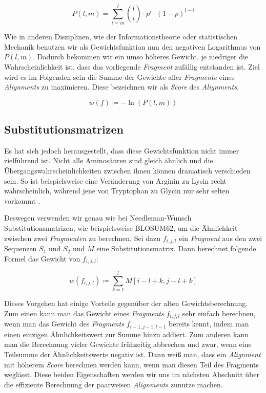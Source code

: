 \begin{equation}
	P(l,m) = \sum_{i=m}^{l} {l \choose i} \cdot p^i \cdot (1-p)^{l-i}
\end{equation}

Wie in anderen Disziplinen, wie der Informationstheorie oder statistischen Mechanik benutzen wir als Gewichtsfunktion nun den negativen Logarithmus von $P(l,m)$. Dadurch bekommen wir ein umso höheres Gewicht, je niedriger die Wahrscheinlichkeit ist, dass das vorliegende \emph{Fragment} zufällig entstanden ist. Ziel wird es im Folgenden sein die Summe der Gewichte aller \emph{Fragmente} eines \emph{Alignments} zu maximieren. Diese bezeichnen wir als \emph{Score} des \emph{Alignments}.

\begin{equation}
	w(f) \coloneqq -\ln(P(l,m))	
\end{equation}

\subsection{Substitutionsmatrizen}

Es hat sich jedoch herausgestellt, dass diese Gewichtsfunktion nicht immer zielführend ist. Nicht alle Aminosäuren sind gleich ähnlich und die Übergangswahrscheinlichkeiten zwischen ihnen können dramatisch verschieden sein. So ist beispielsweise eine Veränderung von Arginin zu Lysin recht wahrscheinlich, während jene von Tryptophan zu Glycin nur sehr selten vorkommt \citep{p13}. 

Deswegen verwenden wir genau wie bei Needleman-Wunsch Substitutionsmatrizen, wie beispielsweise BLOSUM62, um die Ähnlichkeit zwischen zwei \emph{Fragmenten} zu berechnen. Sei dazu $f_{i,j,l}$ ein \emph{Fragment} aus den zwei Sequenzen $S_1$ und $S_2$ und $M$ eine Substitutionsmatrix. Dann berechnet folgende Formel das Gewicht von $f_{i,j,l}$:

\begin{equation}
	w(f_{i,j,l}) \coloneqq \sum_{k=1}^{l} M[i\!-\!l\!+\!k,j\!-\!l\!+\!k]
\end{equation}

Dieses Vorgehen hat einige Vorteile gegenüber der alten Gewichtsberechnung. Zum einen kann man das Gewicht eines \emph{Fragments} $f_{i,j,l}$ sehr einfach berechnen, wenn man das Gewicht des \emph{Fragments} $f_{i-1,j-1,l-1}$ bereits kennt, indem man einen einzigen Ähnlichkeitswert zur Summe hinzu addiert. Zum anderen kann man die Berechnung vieler Gewichte frühzeitig abbrechen und zwar, wenn eine Teilsumme der Ähnlichkeitswerte negativ ist. Dann weiß man, dass ein \emph{Alignment} mit höherem \emph{Score} berechnen werden kann, wenn man diesen Teil des Fragments weglässt. Diese beiden Eigenschaften werden wir uns im nächsten Abschnitt über die effiziente Berechnung der paarweisen \emph{Alignments} zunutze machen.

